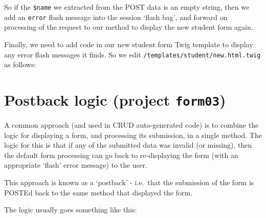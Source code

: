 \documentclass[a4paperpaper,openright]{book}
\newenvironment{Shaded}{}{}
\newcommand{\KeywordTok}[1]{\textcolor[rgb]{0.00,0.44,0.13}{\textbf{#1}}}
\newcommand{\NormalTok}[1]{#1}
\newcommand{\OtherTok}[1]{\textcolor[rgb]{0.00,0.44,0.13}{#1}}
\newcommand{\StringTok}[1]{\textcolor[rgb]{0.25,0.44,0.63}{#1}}
\begin{document}
So if the \texttt{\$name} we extracted from the POST data is an empty
string, then we add an \texttt{error} flash message into the session
`flash bag', and forward on processing of the request to our method to
display the new student form again.

Finally, we need to add code in our new student form Twig template to
display any error flash messages it finds. So we edit
\texttt{/templates/student/new.html.twig} as follows:

\begin{Shaded}
\end{Shaded}

\hypertarget{postback-logic-project-form03}{%
\section{\texorpdfstring{Postback logic (project
\texttt{form03})}{Postback logic (project form03)}}\label{postback-logic-project-form03}}

A common approach (and used in CRUD auto-generated code) is to combine
the logic for displaying a form, and processing its submission, in a
single method. The logic for this is that if any of the submitted data
was invalid (or missing), then the default form processing can go back
to re-displaying the form (with an appropriate `flash' error message) to
the user.

This approach is known as a `postback' - i.e.~that the submission of the
form is POSTEd back to the same method that displayed the form.

The logic usually goes something like this:
\end{document}
